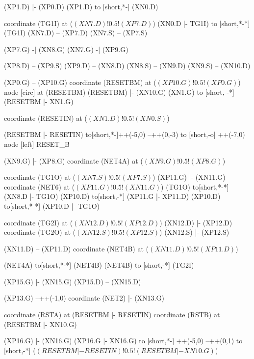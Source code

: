 \begin{circuitikz}[american]
	(XP1.D) |- (XP0.D)
	(XP1.D) to [short,*-] (XN0.D)
	
	coordinate (TG1I) at ($(XN7.D)!0.5!(XP7.D)$)
	(XN0.D |- TG1I) to [short,*-*] (TG1I)
	(XN7.D) -- (XP7.D)
	(XN7.S) -- (XP7.S)
	
	(XP7.G) -| (XN8.G)
	(XN7.G)  -| (XP9.G)
	
	(XP8.D) -- (XP9.S)
	(XP9.D) -- (XN8.D)
	(XN8.S) -- (XN9.D)
	(XN9.S) -- (XN10.D)
	
	(XP0.G) -- (XP10.G)
	coordinate (RESETBM) at ($(XP10.G)!0.5!(XP0.G)$)%
	node [circ] at (RESETBM){}
	(RESETBM) |- (XN10.G)
	(XN1.G) to [short, -*] (RESETBM |- XN1.G)%
	
	
	coordinate (RESETIN) at ($(XN1.D)!0.5!(XN0.S)$)
	
	(RESETBM |- RESETIN) to[short,*-]++(-5,0) --++(0,-3) to [short,-o] ++(-7,0) node [left] {RESET\_B}
	
	(XN9.G) |- (XP8.G)
	coordinate (NET4A) at ($(XN9.G)!0.5!(XP8.G)$)%
	
	
	coordinate (TG1O) at ($(XN7.S)!0.5!(XP7.S)$)
	(XP11.G) |- (XN11.G) 
	coordinate (NET6) at ($(XP11.G)!0.5!(XN11.G)$)
	(TG1O) to[short,*-*] (XN8.D |- TG1O) 
	(XP10.D) to[short,-*] (XP11.G |- XP11.D)
	(XP10.D) to[short,*-*] (XP10.D |- TG1O)
	
	
	coordinate (TG2I) at ($(XN12.D)!0.5!(XP12.D)$)
	(XN12.D) |- (XP12.D)
	coordinate (TG2O) at ($(XN12.S)!0.5!(XP12.S)$)
	(XN12.S) |- (XP12.S)	
	
	(XN11.D) -- (XP11.D)
	coordinate (NET4B) at ($(XN11.D)!0.5!(XP11.D)$) 
	
	(NET4A) to[short,*-*] (NET4B)
	(NET4B) to [short,-*] (TG2I)
	
	
	(XP15.G) |- (XN15.G)
	(XP15.D) -- (XN15.D)
	
	
	
	(XP13.G) --++(-1,0) coordinate (NET2) |- (XN13.G)
	
	coordinate (RSTA) at (RESETBM |- RESETIN)	
	coordinate (RSTB) at (RESETBM |- XN10.G)
	
	(XP16.G) |- (XN16.G)
	(XP16.G |- XN16.G) to [short,*-] ++(-5,0) --++(0,1) to [short,-*]
	($(RESETBM |- RESETIN)!0.5!(RESETBM |- XN10.G)$) 
	

\end{circuitikz}
